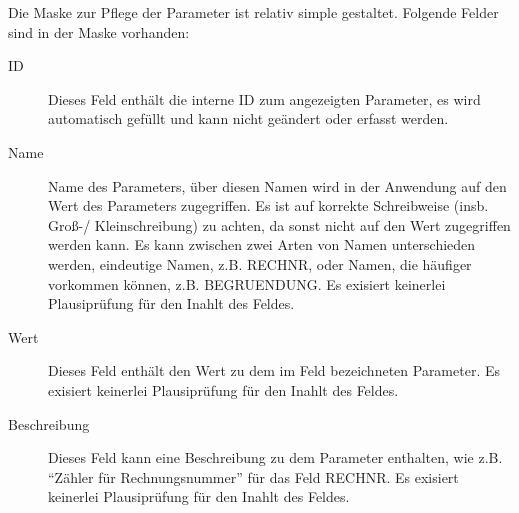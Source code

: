 Die Maske zur Pflege der Parameter ist relativ simple gestaltet. 
Folgende Felder sind in der Maske vorhanden:

\begin{description}
\item[ID] Dieses Feld enthält die interne ID zum angezeigten Parameter, es wird
automatisch gefüllt und kann nicht geändert oder erfasst werden.
\item[Name] Name des Parameters, über diesen Namen wird in der 
Anwendung auf den Wert des Parameters zugegriffen. Es ist auf korrekte 
Schreibweise (insb. Groß-/ Kleinschreibung) zu achten, da sonst nicht
auf den Wert zugegriffen werden kann. Es kann zwischen zwei Arten von
Namen unterschieden werden, eindeutige Namen, z.B. RECHNR, oder Namen, die 
häufiger vorkommen können, z.B. BEGRUENDUNG. Es exisiert keinerlei
Plausiprüfung für den Inahlt des Feldes.
\item[Wert] Dieses Feld enthält den Wert zu dem im Feld 
bezeichneten Parameter. Es exisiert keinerlei Plausiprüfung für den 
Inahlt des Feldes.
\item[Beschreibung] 
Dieses Feld kann eine Beschreibung zu dem Parameter
enthalten, wie z.B. ``Zähler für Rechnungsnummer'' für das Feld RECHNR.
Es exisiert keinerlei Plausiprüfung für den Inahlt des Feldes.
\end{description}

